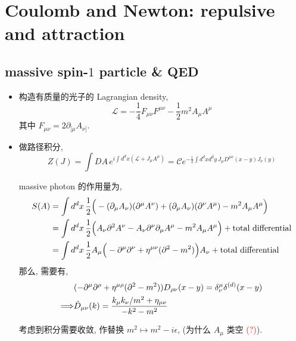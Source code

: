 \chapter{Coulomb and Newton: repulsive and attraction}
\section{massive spin-\texorpdfstring{$1$}{1} particle \& QED}
\begin{itemize}
	\item 构造有质量的光子的 Lagrangian density,
	\begin{equation}
		\mathcal{L} = - \frac{1}{4} F_{\mu \nu} F^{\mu \nu} - \frac{1}{2} m^2 A_\mu A^\mu
	\end{equation}
	其中 $F_{\mu \nu} = 2 \partial_{[\mu} A_{\nu]}$.
	
	\item 做路径积分,
	\begin{equation}
		Z(J) = \int DA \, e^{i \int d^d x (\mathcal{L} + J_\mu A^\mu)} = \mathcal{C} e^{- \frac{i}{2} \int d^d x d^d y \, J_\mu D^{\mu \nu}(x - y) J_\nu(y)}
	\end{equation}
	
	\begin{tcolorbox}[title=calculation:]
		massive photon 的作用量为,
		\begin{align}
			S(A) &= \int d^d x \, \frac{1}{2} \Big( - (\partial_\mu A_\nu) (\partial^\mu A^\nu) + (\partial_\mu A_\nu) (\partial^\nu A^\mu) - m^2 A_\mu A^\mu \Big) \notag \\
			&= \int d^d x \, \frac{1}{2} \Big( A_\nu \partial^2 A^\nu - A_\nu \partial^\nu \partial_\mu A^\mu - m^2 A_\mu A^\mu \Big) + \text{total differential} \notag \\
			&= \int d^d x \, \frac{1}{2} A_\mu \Big( - \partial^\mu \partial^\nu + \eta^{\mu \nu} (\partial^2 - m^2) \Big) A_\nu + \text{total differential}
		\end{align}
		那么, 需要有,
		\begin{align}
			& (- \partial^\mu \partial^\rho + \eta^{\mu \rho} (\partial^2 - m^2)) D_{\rho \nu}(x - y) = \delta^\mu_\nu \delta^{(d)}(x - y) \notag \\
			\Longrightarrow & \tilde{D}_{\mu \nu}(k) = \frac{k_\mu k_\nu / m^2 + \eta_{\mu \nu}}{- k^2 - m^2}
		\end{align}
	\end{tcolorbox}
	
	考虑到积分需要收敛, 作替换 $m^2 \mapsto m^2 - i \epsilon$, (为什么 $A_\mu$ 类空 \textcolor{red}{(?)}).
	

\end{itemize}
